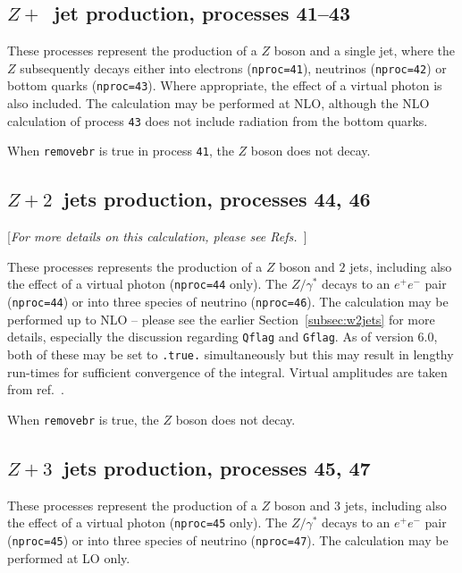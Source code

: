 \subsection{$Z+$~jet production, processes 41--43}
\label{subsec:zjet}

These processes represent the production of a $Z$ boson and a single jet,
where the $Z$ subsequently
decays either into electrons ({\tt nproc=41}), neutrinos ({\tt nproc=42})
or bottom quarks ({\tt nproc=43}). Where appropriate, the effect of a virtual
photon is also included. The calculation may be performed at NLO,
although the NLO calculation of process {\tt 43} does not include radiation
from the bottom quarks.

When {\tt removebr} is true in process {\tt 41}, the $Z$ boson does not decay.

\subsection{$Z+2$~jets production, processes 44, 46}
\label{subsec:z2jets}

\begin{center}
[{\it For more details on this calculation, please see Refs.~\cite{Campbell:2002tg,Campbell:2003hd}}]
\end{center}

These processes represents the production of a $Z$ boson and $2$ jets,
including also the effect of a virtual photon ({\tt nproc=44} only). The $Z/\gamma^*$ decays
to an $e^+ e^-$ pair ({\tt nproc=44}) or into three species of neutrino ({\tt nproc=46}).
The calculation may be performed up to NLO --
please see the earlier Section~\ref{subsec:w2jets} for more details,
especially the discussion regarding {\tt Qflag} and {\tt Gflag}.
As of version 6.0, both of these may be set to {\tt .true.} simultaneously but this
may result in lengthy run-times for sufficient convergence of the integral.
Virtual amplitudes are taken from ref.~\cite{Bern:1997sc}.

When {\tt removebr} is true, the $Z$ boson does not decay.


\subsection{$Z+3$~jets production, processes 45, 47}
\label{subsec:z3jets}

These processes represent the production of a $Z$ boson and $3$ jets,
including also the effect of a virtual photon ({\tt nproc=45} only). The $Z/\gamma^*$ decays
to an $e^+ e^-$ pair ({\tt nproc=45}) or into three species of neutrino ({\tt nproc=47}).
The calculation may be performed at LO only.

